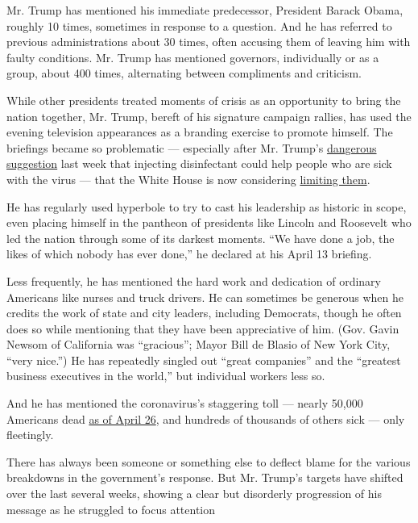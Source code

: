 Mr. Trump has mentioned his immediate predecessor, President Barack
Obama, roughly 10 times, sometimes in response to a question. And he has
referred to previous administrations about 30 times, often accusing them
of leaving him with faulty conditions. Mr. Trump has mentioned
governors, individually or as a group, about 400 times, alternating
between compliments and criticism.

While other presidents treated moments of crisis as an opportunity to
bring the nation together, Mr. Trump, bereft of his signature campaign
rallies, has used the evening television appearances as a branding
exercise to promote himself. The briefings became so problematic ---
especially after Mr. Trump's
\href{https://www.nytimes.com/2020/04/24/us/politics/trump-inject-disinfectant-bleach-coronavirus.html}{dangerous
suggestion} last week that injecting disinfectant could help people who
are sick with the virus --- that the White House is now considering
\href{https://www.nytimes.com/2020/04/26/us/politics/trump-disinfectant.html}{limiting
them}.

He has regularly used hyperbole to try to cast his leadership as
historic in scope, even placing himself in the pantheon of presidents
like Lincoln and Roosevelt who led the nation through some of its
darkest moments. ``We have done a job, the likes of which nobody has
ever done,'' he declared at his April 13 briefing.

Less frequently, he has mentioned the hard work and dedication of
ordinary Americans like nurses and truck drivers. He can sometimes be
generous when he credits the work of state and city leaders, including
Democrats, though he often does so while mentioning that they have been
appreciative of him. (Gov. Gavin Newsom of California was ``gracious'';
Mayor Bill de Blasio of New York City, ``very nice.'') He has repeatedly
singled out ``great companies'' and the ``greatest business executives
in the world,'' but individual workers less so.

And he has mentioned the coronavirus's staggering toll --- nearly 50,000
Americans dead
\href{https://www.nytimes.com/interactive/2020/us/coronavirus-us-cases.html}{as
of April 26}, and hundreds of thousands of others sick --- only
fleetingly.

There has always been someone or something else to deflect blame for the
various breakdowns in the government's response. But Mr. Trump's targets
have shifted over the last several weeks, showing a clear but disorderly
progression of his message as he struggled to focus attention

